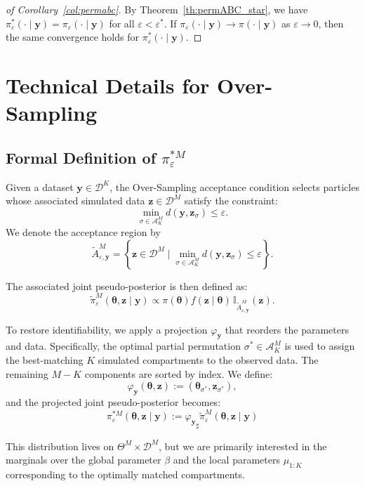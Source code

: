 \documentclass[lineno]{biometrika}
\def\dataspace{\mathcal{D}}
\def\globparam{\beta}
\def\locparam{\mu}
\def\obsdata{\mathbf{y}}
\def\param{\boldsymbol{\theta}}
\def\proj{\varphi_{\obsdata}}
\def\simdata{\mathbf{z}}
\def\projsharp{{\varphi_{\mathbf{y}}}_{\sharp}}
\begin{document}
\medskip

\begin{proof}[of Corollary~\ref{col:permabc}]
By Theorem~\ref{th:permABC_star}, we have $\pi^*_{\varepsilon}(\cdot \mid \obsdata) = \pi_{\varepsilon}(\cdot \mid \obsdata)$ for all $\varepsilon < \varepsilon^*$. If $\pi_{\varepsilon}(\cdot \mid \obsdata) \to \pi(\cdot \mid \obsdata)$ as $\varepsilon \to 0$, then the same convergence holds for $\pi^*_{\varepsilon}(\cdot \mid \obsdata)$.
\end{proof}



\section{Technical Details for Over-Sampling}
\label{appendix_os}

\subsection{Formal Definition of \( \pi^{*M}_\varepsilon \)}

Given a dataset \( \obsdata \in \dataspace^K \), the Over-Sampling acceptance condition selects particles whose associated simulated data \( \simdata \in \dataspace^M \) satisfy the constraint:
\[
\min_{\sigma \in \mathcal A_K^M} d(\obsdata, \simdata_\sigma) \leq \varepsilon.
\]
We denote the acceptance region by
\[
\tilde A_{\varepsilon, \obsdata}^{M} = \left\{ \simdata \in \dataspace^M \mid \min_{\sigma \in \mathcal A_K^M} d(\obsdata, \simdata_\sigma) \leq \varepsilon \right\}.
\]

The associated joint pseudo-posterior is then defined as:
\[
\tilde{\pi}_\varepsilon^M(\param, \simdata \mid \obsdata) \propto \pi(\param) f(\simdata \mid \param) \, \mathbb{I}_{\tilde A_{\varepsilon, \obsdata}^{M}}(\simdata).
\]

To restore identifiability, we apply a projection \( \proj \) that reorders the parameters and data. Specifically, the optimal partial permutation \( \sigma^* \in \mathcal A_K^M \) is used to assign the best-matching \( K \) simulated compartments to the observed data. The remaining \( M - K \) components are sorted by index. We define:
\[
\proj(\param, \simdata) := (\param_{\sigma^*}, \simdata_{\sigma^*}),
\]
and the projected joint pseudo-posterior becomes:
\[
\pi^{*M}_{\varepsilon}(\param, \simdata \mid \obsdata)
:= \projsharp \tilde{\pi}_{\varepsilon}^{M}(\param, \simdata \mid \obsdata)
\]


This distribution lives on \( \Theta^M \times \dataspace^M \), but we are primarily interested in the marginals over the global parameter \( \globparam \) and the local parameters \( \locparam_{1:K} \) corresponding to the optimally matched compartments.
\end{document}
